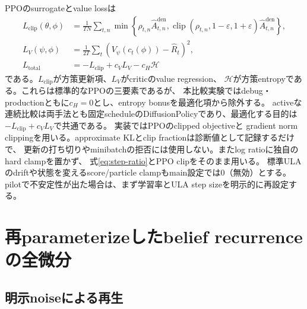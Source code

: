 \documentclass[a4paper,11pt]{article}
\newcommand{\clip}{\operatorname{clip}}
\newcommand{\den}{\mathrm{den}}
\begin{document}
PPOのsurrogateとvalue lossは
\begin{align}
  L_{\mathrm{clip}}(\theta,\phi)
  &=\frac{1}{TN}\sum_{t,n}
    \min\!\left\{
      \rho_{t,n}\widehat A_{t,n}^{\den},
      \clip(\rho_{t,n},1-\varepsilon,1+\varepsilon)
      \widehat A_{t,n}^{\den}
    \right\},\\
  L_V(\psi,\phi)
  &=\frac{1}{2T}\sum_t
    \left(V_\psi(c_t(\phi))-\widehat R_t\right)^2,\\
  L_{\mathrm{total}}
  &=-L_{\mathrm{clip}}+c_VL_V-c_H\mathcal H
  \label{eq:ppo-total}
\end{align}
である。$L_{\mathrm{clip}}$が方策更新項、$L_V$がcriticのvalue regression、
$\mathcal H$が方策entropyである。これらは標準的なPPOの三要素であるが、
本比較実験ではdebug・productionともに$c_H=0$とし、entropy bonusを最適化項から除外する。
activeな連続比較は両手法とも固定scheduleのDiffusionPolicyであり、最適化する目的は
$-L_{\mathrm{clip}}+c_VL_V$で共通である。
実装ではPPOのclipped objectiveと
gradient norm clippingを用いる。approximate KLとclip fractionは診断値として記録するだけで、
更新の打ち切りやminibatchの拒否には使用しない。またlog ratioに独自のhard clampを置かず、
式\eqref{eq:step-ratio}とPPO clipをそのまま用いる。
標準ULAのdriftや状態を変えるscore/particle clampもmain設定では0（無効）とする。
pilotで不安定性が出た場合は、まず学習率とULA step sizeを明示的に再設定する。

\section{再parameterizeしたbelief recurrenceの全微分}

\subsection{明示noiseによる再生}
\end{document}
